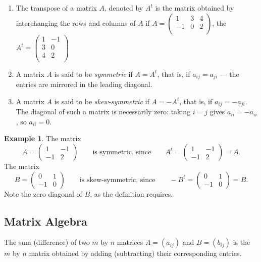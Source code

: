 \documentclass[11pt,a4paper]{article}
\theoremstyle{definition}
\newtheorem{exa}[thm]{Example}
\begin{document}
\begin{enumerate}
\item The transpose of a matrix $A$, denoted by $A^t$ is the matrix obtained by interchanging the rows and columns of $A$ if $A=
\begin{pmatrix}
1&3&4\\-1&0&2\\
\end{pmatrix}
$, the $ A^t=
\begin{pmatrix}
1&-1\\3&0\\4&2\\
\end{pmatrix}
$

\item A matrix $A$ is said to be \emph{symmetric} if $A=A^t$, that is, if
$a_{ij}=a_{ji}$ --- the entries are mirrored in the leading diagonal.

\item A matrix $A$ is said to be \emph{skew-symmetric} if $A=-A^t$, that is, if
$a_{ij}=-a_{ji}$. The diagonal of such a matrix is necessarily zero: taking
$i=j$ gives $a_{ii}=-a_{ii}$, so $a_{ii}=0$.
\end{enumerate}


\begin{exa}
The matrix
$$A=\begin{pmatrix}1&-1\\-1&2\end{pmatrix}
\qquad\text{is symmetric, since}\qquad
A^t=\begin{pmatrix}1&-1\\-1&2\end{pmatrix}=A.$$
The matrix
$$B=\begin{pmatrix}0&1\\-1&0\end{pmatrix}
\qquad\text{is skew-symmetric, since}\qquad
-B^t=\begin{pmatrix}0&1\\-1&0\end{pmatrix}=B.$$
Note the zero diagonal of $B$, as the definition requires.
\end{exa}


\subsection{Matrix Algebra}
The sum (difference) of two $m$ by $n$ matrices $A=(a_{ij})$ and $B=(b_{ij})$ is the $m$ by $n$ matrix obtained by adding (subtracting) their corresponding entries.
\end{document}
